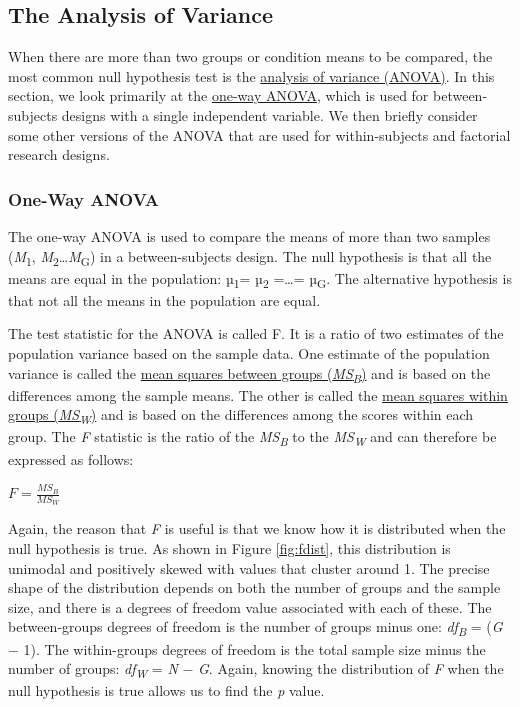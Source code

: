 \documentclass[
]{krantz}
\begin{document}
\subsection*{The Analysis of Variance}\label{the-analysis-of-variance}


When there are more than two groups or condition means to be compared, the most common null hypothesis test is the \hyperref[analysis-of-variance-anova]{analysis of variance (ANOVA)}. In this section, we look primarily at the \hyperref[one-way-anova]{one-way ANOVA}, which is used for between-subjects designs with a single independent variable. We then briefly consider some other versions of the ANOVA that are used for within-subjects and factorial research designs.

\subsubsection*{One-Way ANOVA}\label{one-way-anova}


The one-way ANOVA is used to compare the means of more than two samples (\emph{M}\textsubscript{1}, \emph{M}\textsubscript{2}\ldots{}\emph{M}\textsubscript{G}) in a between-subjects design. The null hypothesis is that all the means are equal in the population: µ\textsubscript{1}= µ\textsubscript{2} =\ldots= µ\textsubscript{G}. The alternative hypothesis is that not all the means in the population are equal.

The test statistic for the ANOVA is called F. It is a ratio of two estimates of the population variance based on the sample data. One estimate of the population variance is called the \hyperref[mean-squares-between-groups-msb]{mean squares between groups (\emph{MS\textsubscript{B}})} and is based on the differences among the sample means. The other is called the \hyperref[mean-squares-within-groups-msw]{mean squares within groups (\emph{MS\textsubscript{W}})} and is based on the differences among the scores within each group. The \emph{F} statistic is the ratio of the \emph{MS\textsubscript{B}} to the \emph{MS\textsubscript{W}} and can therefore be expressed as follows:

\(F=\frac{MS_B}{MS_W}\)

Again, the reason that \emph{F} is useful is that we know how it is distributed when the null hypothesis is true. As shown in Figure \ref{fig:fdist}, this distribution is unimodal and positively skewed with values that cluster around 1. The precise shape of the distribution depends on both the number of groups and the sample size, and there is a degrees of freedom value associated with each of these. The between-groups degrees of freedom is the number of groups minus one: \emph{df\textsubscript{B}} = (\emph{G} − 1). The within-groups degrees of freedom is the total sample size minus the number of groups: \emph{df\textsubscript{W}} = \emph{N} − \emph{G}. Again, knowing the distribution of \emph{F} when the null hypothesis is true allows us to find the \emph{p} value.
\end{document}
